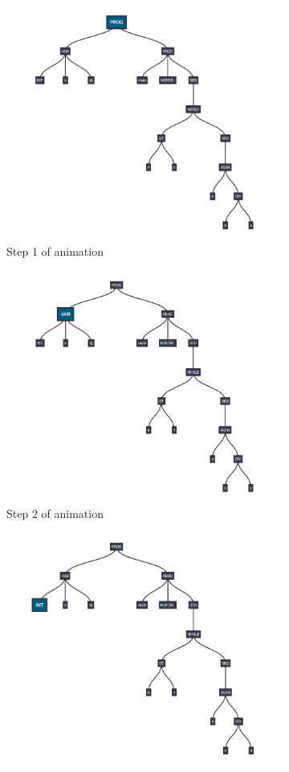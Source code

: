 \documentclass{l4proj}
\begin{document}
\begin{figure}[h]
	\centering
	\begin{subfigure}[b]{.33\textwidth}
		\centering
		\includegraphics[width=.8\linewidth]{images/implast.PNG}
		\caption{Step 1 of animation}
	\end{subfigure}%
	\begin{subfigure}[b]{.33\textwidth}
		\centering
		\includegraphics[width=.8\linewidth]{images/implanim1.PNG}
		\caption{Step 2 of animation}
	\end{subfigure}%
	\begin{subfigure}[b]{.33\textwidth}
		\centering
		\includegraphics[width=.8\linewidth]{images/implanim2.PNG}

\end{subfigure}
\end{figure}
\end{document}

